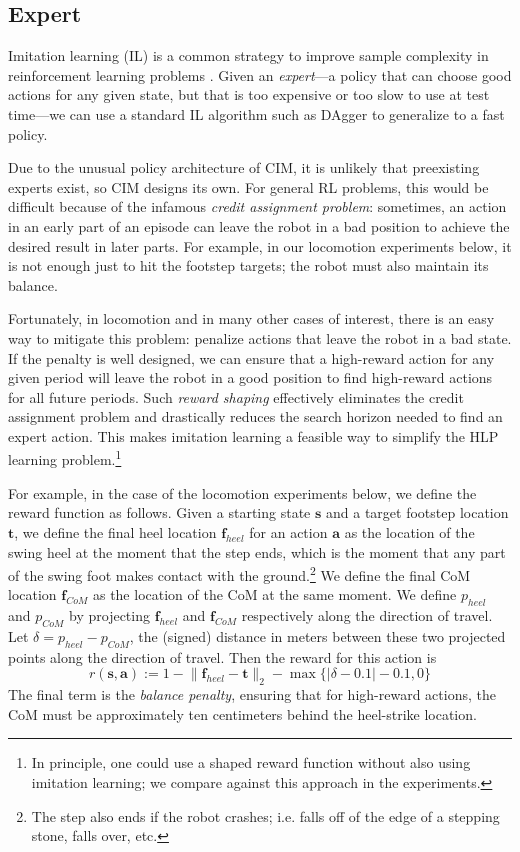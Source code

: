 \documentclass[conference]{IEEEtran}
\newcommand{\norm}[1]{\lVert #1 \rVert}
\begin{document}
\subsection{Expert} \label{sec:expert}

Imitation learning (IL) is a common strategy to improve sample complexity in reinforcement learning problems \citep{osa2018algorithmic}.
Given an \emph{expert}---a policy that can choose good actions for any given state, but that is too expensive or too slow to use at test time---we can use
a standard IL algorithm such as DAgger \citep{ross2011reduction} to generalize to a fast policy.

Due to the unusual policy architecture of CIM, it is unlikely that preexisting experts exist,
so CIM designs its own.
For general RL problems, this would be difficult because of the infamous \emph{credit assignment problem}:
sometimes, an action in an early part of an episode can leave the robot in a bad position to achieve the desired result in later parts.
For example, in our locomotion experiments below, it is not enough just to hit the footstep targets; the robot must also maintain its balance.

Fortunately, in locomotion and in many other cases of interest, there is an easy way to mitigate this problem: penalize actions that leave the robot in a bad state.
If the penalty is well designed, we can ensure that a high-reward action for any given period will leave the robot in a good position to find high-reward actions for all future periods.
Such \emph{reward shaping} effectively eliminates the credit assignment problem and drastically reduces the search horizon needed to find an expert action.
This makes imitation learning a feasible way to simplify the HLP learning problem.\footnote{
In principle, one could use a shaped reward function without also using imitation learning; we compare against this approach in the experiments.}

For example, in the case of the locomotion experiments below, we define the reward function as follows.
Given a starting state $\mathbf{s}$ and a target footstep location $\mathbf{t}$, we define the final heel location $\mathbf{f}_{heel}$ for an action $\mathbf{a}$ as the location of the swing heel at the moment that the step ends, which is the moment that any part of the swing foot makes contact with the ground.\footnote{The step also ends if the robot crashes; i.e. falls off of the edge of a stepping stone, falls over, etc.}
We define the final CoM location $\mathbf{f}_{CoM}$ as the location of the CoM at the same moment.
We define ${p}_{heel}$ and ${p}_{CoM}$ by projecting $\mathbf{f}_{heel}$ and $\mathbf{f}_{CoM}$ respectively along the direction of travel.
Let $\delta = {p}_{heel} - {p}_{CoM}$, the (signed) distance in meters between these two projected points along the direction of travel.
Then the reward for this action is
\[
r(\mathbf{s},\mathbf{a}) := 1 - \norm{\mathbf{f}_{heel} - \mathbf{t}}_2 - \max\{|\delta-0.1|-0.1, 0\}
\]
The final term is the \emph{balance penalty}, ensuring that for high-reward actions, the CoM must be approximately ten centimeters behind the heel-strike location.
\end{document}
